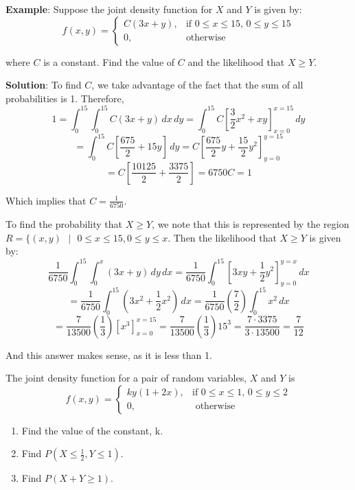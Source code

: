 \textbf{Example}: Suppose the joint density function for $X$ and $Y$ is given 
by:
$$f(x, y) = 
\begin{cases}
C(3x + y),& \text{if }0 \leq x \leq 15\text{, }0 \leq y \leq 15\\
0,&\text{otherwise}
\end{cases}
$$

where $C$ is a constant. Find the value of $C$ and the likelihood that $X \geq 
Y$.

\textbf{Solution}: To find $C$, we take advantage of the fact that the sum of 
all probabilities is 1. Therefore,
$$1 = \int_0^{15} \int_0^{15} C(3x + y)\,dx\,dy = \int_0^{15} C \left[ \frac{3
}{2}x^2 + xy \right]_{x = 0}^{x = 15}\,dy$$
$$= \int_0^{15} C \left[ \frac{675}{2} + 15y \right]\,dy = C \left[ \frac{675}{
2}y + \frac{15}{2}y^2 \right]_{y = 0}^{y = 15}$$
$$= C \left[ \frac{10125}{2} + \frac{3375}{2} \right] = 6750C = 1$$

Which implies that $C = \frac{1}{6750}$.

To find the probability that $X \geq Y$, we note that this is represented by 
the region $R = \{(x, y)\text{ }|\text{ }0 \leq x \leq 15, 0 \leq y \leq x$. 
Then the likelihood that $X \geq Y$ is given by:
$$\frac{1}{6750} \int_0^{15} \int_0^x \left( 3x + y \right) \,dy\,dx = \frac{
1}{6750} \int_0^{15} \left[ 3xy + \frac{1}{2}y^2 \right]_{y = 0}^{y = x}\,dx$$
$$= \frac{1}{6750} \int_0^{15} \left(3x^2 + \frac{1}{2}x^2 \right)\,dx = \frac{
1}{6750} \left( \frac{7}{2} \right) \int_0^{15} x^2\,dx$$
$$= \frac{7}{13500} \left( \frac{1}{3} \right) \left[x^3 \right]_{x = 0}^{x = 
15} = \frac{7}{13500} \left( \frac{1}{3} \right) 15^3 = \frac{7 \cdot 3375}{3 
\cdot 13500} = \frac{7}{12}$$

And this answer makes sense, as it is less than 1. 

\begin{Exercise}[title = {Joint Density Functions}, label = joint]
The joint density function for a pair of random variables, $X$ and $Y$ is
$$f(x, y) = 
\begin{cases}
	ky(1 + 2x),& \text{if } 0 \leq x \leq 1\text{, }0 \leq y \leq 2\\
	0,&\text{ otherwise}
\end{cases}$$
\begin{enumerate}
\item Find the value of the constant, k.
\item Find $P(X \leq \frac{1}{2}, Y \leq 1)$.
\item Find $P(X + Y \geq 1)$.
\end{enumerate}
\vspace{70mm}
\end{Exercise}

